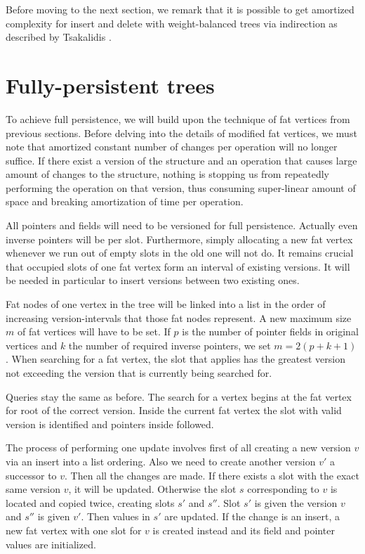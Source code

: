 Before moving to the next section, we remark that it is possible to get  amortized complexity for insert and delete with weight-balanced trees via indirection as described by Tsakalidis \cite{list-ordering}.

\section{Fully-persistent trees}

To achieve full persistence, we will build upon the technique of fat vertices from previous sections. 
Before delving into the details of modified fat vertices, we must note that amortized constant number of changes per operation will no longer suffice. If there exist a version of the structure and an operation that causes large amount of changes to the structure, nothing is stopping us from repeatedly performing the operation on that version, thus consuming super-linear amount of space and breaking amortization of time per operation.

All pointers and fields will need to be versioned for full persistence. Actually even inverse pointers will be per slot. Furthermore, simply allocating a new fat vertex whenever we run out of empty slots in the old one will not do. It remains crucial that occupied slots of one fat vertex form an interval of existing versions. It will be needed in particular to insert versions between two existing ones.

Fat nodes of one vertex in the tree will be linked into a list in the order of increasing version-intervals that those fat nodes represent. A new maximum size~$m$ of fat vertices will have to be set. If $p$ is the number of pointer fields in original vertices and $k$ the number of required inverse pointers, we set $m = 2(p+k+1)$.
When searching for a fat vertex, the slot that applies has the greatest version not exceeding the version that is currently being searched for.

Queries stay the same as before. The search for a vertex begins at the fat vertex for root of the correct version. Inside the current fat vertex the slot with valid version is identified and pointers inside followed.

The process of performing one update involves first of all creating a new version $v$ via an insert into a list ordering. Also we need to create another version $v'$ a successor to $v$. Then all the changes are made. If there exists a slot with the exact same version $v$, it will be updated. Otherwise the slot $s$ corresponding to $v$ is located and copied twice, creating slots $s'$ and $s''$. Slot $s'$ is given the version $v$ and $s''$ is given $v'$. Then values in $s'$ are updated.
If the change is an insert, a new fat vertex with one slot for $v$ is created instead and its field and pointer values are initialized.

